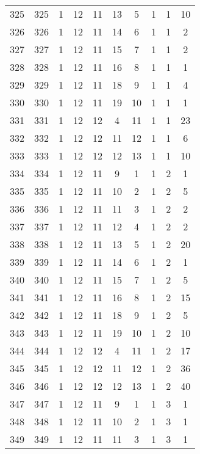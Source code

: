 \begin{longtable}{cccccccccc}
  325 & 325 &   1 &  12 &  11 &  13 &   5 &   1 &   1 &  10 \\ 
  326 & 326 &   1 &  12 &  11 &  14 &   6 &   1 &   1 &   2 \\ 
  327 & 327 &   1 &  12 &  11 &  15 &   7 &   1 &   1 &   2 \\ 
  328 & 328 &   1 &  12 &  11 &  16 &   8 &   1 &   1 &   1 \\ 
  329 & 329 &   1 &  12 &  11 &  18 &   9 &   1 &   1 &   4 \\ 
  330 & 330 &   1 &  12 &  11 &  19 &  10 &   1 &   1 &   1 \\ 
  331 & 331 &   1 &  12 &  12 &   4 &  11 &   1 &   1 &  23 \\ 
  332 & 332 &   1 &  12 &  12 &  11 &  12 &   1 &   1 &   6 \\ 
  333 & 333 &   1 &  12 &  12 &  12 &  13 &   1 &   1 &  10 \\ 
  334 & 334 &   1 &  12 &  11 &   9 &   1 &   1 &   2 &   1 \\ 
  335 & 335 &   1 &  12 &  11 &  10 &   2 &   1 &   2 &   5 \\ 
  336 & 336 &   1 &  12 &  11 &  11 &   3 &   1 &   2 &   2 \\ 
  337 & 337 &   1 &  12 &  11 &  12 &   4 &   1 &   2 &   2 \\ 
  338 & 338 &   1 &  12 &  11 &  13 &   5 &   1 &   2 &  20 \\ 
  339 & 339 &   1 &  12 &  11 &  14 &   6 &   1 &   2 &   1 \\ 
  340 & 340 &   1 &  12 &  11 &  15 &   7 &   1 &   2 &   5 \\ 
  341 & 341 &   1 &  12 &  11 &  16 &   8 &   1 &   2 &  15 \\ 
  342 & 342 &   1 &  12 &  11 &  18 &   9 &   1 &   2 &   5 \\ 
  343 & 343 &   1 &  12 &  11 &  19 &  10 &   1 &   2 &  10 \\ 
  344 & 344 &   1 &  12 &  12 &   4 &  11 &   1 &   2 &  17 \\ 
  345 & 345 &   1 &  12 &  12 &  11 &  12 &   1 &   2 &  36 \\ 
  346 & 346 &   1 &  12 &  12 &  12 &  13 &   1 &   2 &  40 \\ 
  347 & 347 &   1 &  12 &  11 &   9 &   1 &   1 &   3 &   1 \\ 
  348 & 348 &   1 &  12 &  11 &  10 &   2 &   1 &   3 &   1 \\ 
  349 & 349 &   1 &  12 &  11 &  11 &   3 &   1 &   3 &   1 \\ 

\end{longtable}
